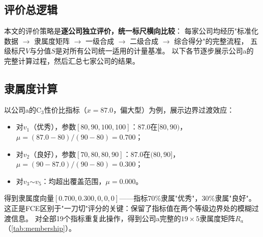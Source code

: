 \documentclass[a4paper,12pt]{ctexart}
\begin{document}
\subsection{评价总逻辑}

本文的评价策略是\textbf{逐公司独立评价，统一标尺横向比较}：
每家公司均经历"标准化数据 $\rightarrow$ 隶属度矩阵 $\rightarrow$
一级合成 $\rightarrow$ 二级合成 $\rightarrow$ 综合得分"的完整流程，
五级标尺$V$与分值$S$是对所有公司统一适用的计量基准。
以下各节逐步展示公司a的完整计算过程，然后汇总七家公司的结果。

\subsection{隶属度计算}

以公司a的C$_3$性价比指标（$x=87.0$，偏大型）为例，展示边界过渡效应：

\begin{itemize}[itemsep=2pt]
    \item 对$v_1$（优秀），参数$[80,90,100,100]$：87.0在$[80,90)$，
          $\mu = (87.0-80)/(90-80) = 0.700$；
    \item 对$v_2$（良好），参数$[70,80,80,90]$：87.0在$(80,90]$，
          $\mu = (90-87.0)/(90-80) = 0.300$；
    \item 对$v_3$$\sim$$v_5$：均超出覆盖范围，$\mu=0.000$。
\end{itemize}

得到隶属度向量$[0.700, 0.300, 0, 0, 0]$——指标70\%隶属"优秀"，30\%隶属"良好"。
这正是FCE区别于"一刀切"评分的关键：保留了指标值在两个等级边界处的模糊过渡信息。
对全部19个指标重复此操作，得到公司a完整的$19\times 5$隶属度矩阵$R_a$（\cref{tab:membership}）。
\end{document}
